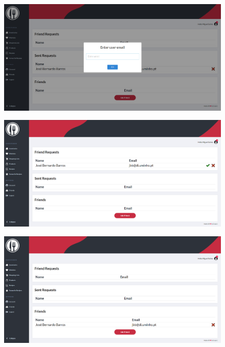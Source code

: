 \documentclass[a4paper]{report}
\begin{document}
    \begin{figure}[H]
        \centering
            \includegraphics[width=\textwidth]{images/produto_final/adicionar_amigo.png}
    \end{figure}

    \begin{figure}[H]
        \centering
            \includegraphics[width=\textwidth]{images/produto_final/pedido_recebido.png}
    \end{figure}

    \begin{figure}[H]
        \centering
            \includegraphics[width=\textwidth]{images/produto_final/amigo_adicionado.png}
    \end{figure}
\end{document}
